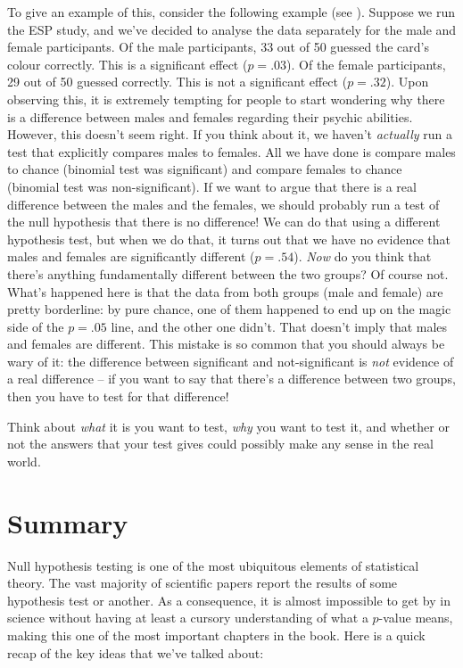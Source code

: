 \documentclass[
  11pt,
  a4paper,
  twoside,symmetric,openright]{book}
\theoremstyle{break}
\theoremstyle{break}
\begin{document}
To give an example of this, consider the following example (see ). Suppose we run the ESP study, and we've decided to analyse the data separately for the male and female participants. Of the male participants, 33 out of 50 guessed the card's colour correctly. This is a significant effect (\(p = .03\)). Of the female participants, 29 out of 50 guessed correctly. This is not a significant effect (\(p = .32\)). Upon observing this, it is extremely tempting for people to start wondering why there is a difference between males and females regarding their psychic abilities. However, this doesn't seem right. If you think about it, we haven't \emph{actually} run a test that explicitly compares males to females. All we have done is compare males to chance (binomial test was significant) and compare females to chance (binomial test was non-significant). If we want to argue that there is a real difference between the males and the females, we should probably run a test of the null hypothesis that there is no difference! We can do that using a different hypothesis test, but when we do that, it turns out that we have no evidence that males and females are significantly different (\(p = .54\)). \emph{Now} do you think that there's anything fundamentally different between the two groups? Of course not. What's happened here is that the data from both groups (male and female) are pretty borderline: by pure chance, one of them happened to end up on the magic side of the \(p = .05\) line, and the other one didn't. That doesn't imply that males and females are different. This mistake is so common that you should always be wary of it: the difference between significant and not-significant is \emph{not} evidence of a real difference -- if you want to say that there's a difference between two groups, then you have to test for that difference!

Think about \emph{what} it is you want to test, \emph{why} you want to test it, and whether or not the answers that your test gives could possibly make any sense in the real world.

\section{Summary}\label{summary-5}

Null hypothesis testing is one of the most ubiquitous elements of statistical theory. The vast majority of scientific papers report the results of some hypothesis test or another. As a consequence, it is almost impossible to get by in science without having at least a cursory understanding of what a \(p\)-value means, making this one of the most important chapters in the book. Here is a quick recap of the key ideas that we've talked about:
\end{document}
